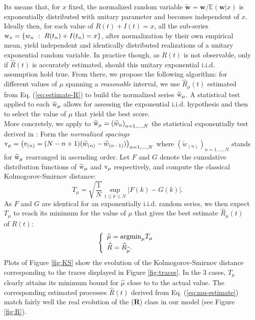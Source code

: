 \documentclass[twoside]{article}
\newcommand{\roy}[2]{#2}
\begin{document}
{
Its means that, for $x$ fixed, the normalized random variable $\widetilde{\mathbf{w}} = \mathbf{w}/\mathbb{E}(\mathbf{w}|x)$ is exponentially distributed with unitary parameter and becomes independent of $x$. Ideally then, for each value of $R(t)+I(t)=x$,  all the sub-series  ${\rm w}_x =\{w_n~:~R(t_n)+I(t_n)=x\}$, after normalization by their own empirical mean, yield independent and identically distributed realizations  of a unitary exponential random variable. In practice though, as $R(t)$ is not observable, only if  $\widehat{R}(t)$ is accurately estimated, should this unitary exponential i.i.d. assumption hold true. From there, we propose the following algorithm: for different values of $\mu$ spanning a {\it reasonable} interval, we use $\widehat{R}_{\mu}(t)$ estimated from \roy{}{Eq.} (\ref{eq:estimate-R}) to build the normalized series $\widetilde{\rm w}_{\mu}$. A statistical test applied to each $\widetilde{\rm w}_{\mu}$ allows for assessing the exponential i.i.d. hypothesis and then to select the value of $\mu$ that yield the best score. \\
More concretely, we apply to $\widetilde{\rm w}_{\mu}=\left(\widetilde{w}_n\right)_{n=1,\ldots,N }$ the statistical exponentially test derived in \cite{Jammalamadaka03}: Form the {\it normalized spacings} ${\rm v}_{\mu} = \left(v_{(n)} =(N - n+1)(\widetilde{w}_{(n)} - \widetilde{w}_{(n - 1)})\right)_{ n=1,...,N}$ where $\left(\widetilde{w}_{(n)}\right)_{n=1,\ldots, N}$ stands for $\widetilde{\rm w}_{\mu}$ rearranged in ascending order. Let $F$ and $G$ denote the cumulative distribution functions of $\widetilde{\rm w}_{\mu}$ and  ${\rm v}_{\mu}$ respectively, and compute the  classical Kolmogorov-Smirnov distance:
\begin{equation}
T_{\mu} = \sqrt{\frac{1}{N}}	 \sup_{1 \leq k \leq N} |F(k) - G(k)|.
\label{eq:KS}
\end{equation}
As $F$ and $G$ are identical for an exponentially i.i.d. random series, we then expect $T_{\mu}$ to reach its minimum  for the value of $\mu$ that gives the best estimate $\widehat{R}_{\mu}(t)$ of $R(t)$:
\begin{equation}
\left\{\begin{array}{l}
\widehat{\mu} = {\rm argmin}_{\mu} T_{\mu} \\[1mm]
\widehat{R} = \widehat{R}_{\widehat{\mu}}.
\end{array}\right.
\label{eq:mu-estimate}
\end{equation}
Plots of Figure \ref{fig:KS} show the evolution of the Kolmogorov-Smirnov distance corresponding to the traces displayed in Figure \ref{fig:traces}. In the 3 cases, $T_{\mu}$ clearly attains its minimum bound for $\widehat{\mu}$ close to to the actual value. The corresponding estimated processes $\widehat{R}(t)$ derived  from \roy{}{Eq.} (\ref{eq:mu-estimate}) match fairly well the real evolution of the ({\bf R}) class in our model (see Figure \ref{fig:R}).\\

 }
\end{document}
